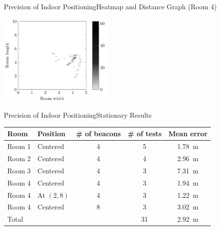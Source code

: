 \begin{frame}{Precision of Indoor Positioning}{Heatmap and Distance Graph (Room 4)}
	\centering\vfill
	  \begin{minipage}[b]{0.49\textwidth}
	  	\centering
	  	\includegraphics[width=\textwidth, height=4.5cm]{../data/estimote-test-results/heatmaps/pdf/36}
			\vspace{0.35cm}
	  \end{minipage}\hfill
	  \begin{minipage}[b]{0.49\textwidth}
	  	\centering      
	  \end{minipage}
\end{frame}

\begin{frame}{Precision of Indoor Positioning}{Stationary Results}
  \centering
  \begin{tabular}{l|l c c c}
  	Room   & Position   & \# of beacons & \# of tests & Mean error        \\ \hline
  	Room 1 & Centered   & \num{4}       & 5           & \SI{1.78}{\meter} \\
  	Room 2 & Centered   & \num{4}       & 4           & \SI{2.96}{\meter} \\
  	Room 3 & Centered   & \num{4}       & 3           & \SI{7.31}{\meter} \\
  	Room 4 & Centered   & \num{4}       & 3           & \SI{1.94}{\meter} \\
  	Room 4 & At $(2,8)$ & \num{4}       & 3           & \SI{1.22}{\meter} \\
  	Room 4 & Centered   & \num{8}       & 3           & \SI{3.02}{\meter} \\ \hline
  	Total  &            &               & 31          & \SI{2.92}{\meter}
  \end{tabular}
\end{frame}

